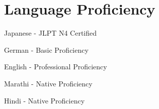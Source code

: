 \documentclass[]{deedy-resume-openfont}
\begin{document}
\begin{minipage}[t]{0.66\textwidth}
\section{Language Proficiency} 

\vspace{\topsep} %

\begin{tightemize}
    \item Japanese - JLPT N4 Certified
    \item German - Basic Proficiency
    \item English - Professional Proficiency
    \item Marathi - Native Proficiency
    \item Hindi - Native Proficiency
\end{tightemize}
    

\end{minipage} 
\end{document}
